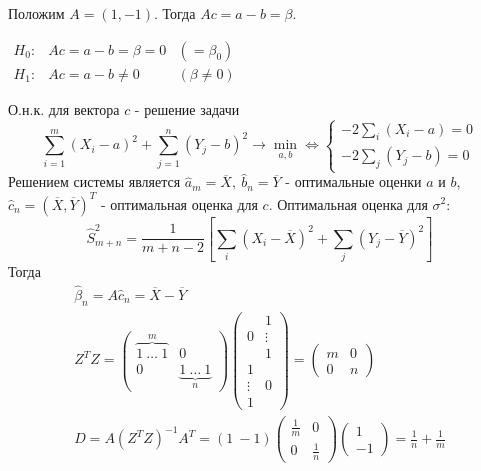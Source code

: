 \begin{example}
Положим $A=(1, -1)$. Тогда $Ac=a-b=\beta$.

$\begin{array}{ccc}
    H_0:& Ac=a-b=\beta=0 &(=\beta_0)\\
    H_1:& Ac=a-b\neq0    &(\beta\neq0)
\end{array}$

О.н.к. для вектора $c$ - решение задачи
\[
    \sum_{i=1}^m(X_i-a)^2+\sum_{j=1}^n(Y_j-b)^2\rightarrow \min_{a, b}
    \Leftrightarrow \begin{cases}
        -2\sum_i(X_i-a) = 0 \\
        -2\sum_j(Y_j-b) = 0
    \end{cases}
\]
Решением системы является $\widehat{a}_m=\overline{X},\ \widehat{b}_n=\overline{Y}$ -
оптимальные оценки $a$ и $b$, $\widehat{c}_n=(\overline{X}, \overline{Y})^T$ - оптимальная
оценка для $c$. Оптимальная оценка для $\sigma^2$:
\[ \widehat{S}^2_{m+n}=\frac{1}{m+n-2}\left[\sum_i(X_i-\overline{X})^2+\sum_j(Y_j-\overline{Y})^2\right] \]
Тогда
\[
\begin{array}{l}
    \widehat{\beta}_n=A\widehat{c}_n=\overline{X}-\overline{Y} \\
    Z^TZ=\left(\begin{array}{cc}
        \overbrace{1\ \ldots\ 1}^m & 0 \\
                0      & \underbrace{1\ \ldots\ 1}_n
    \end{array}\right)
    \left(\begin{array}{cc}
            & 1 \\
        0 & \vdots \\
            & 1 \\
        1  & \\
        \vdots & 0 \\
        1  &
    \end{array}\right) = \left(\begin{array}{cc}
        m & 0 \\
        0 & n
    \end{array}\right) \\
    D=A(Z^TZ)^{-1}A^T=
    \left(1\ -1 \right)
    \left(\begin{array}{cc}
        \frac{1}{m} & 0 \\
        0 & \frac{1}{n}
    \end{array}\right)
    \left(\begin{array}{c}
        1 \\
        -1
    \end{array}\right) = \frac{1}{n} + \frac{1}{m}

\end{array}\]
\end{example}
